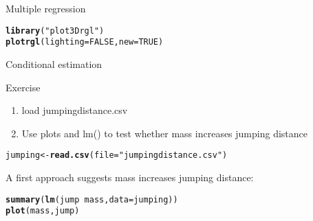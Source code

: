 \documentclass[10pt]{beamer}\usepackage[]{graphicx}\usepackage[]{color}
\makeatletter
\newcommand{\hlnum}[1]{\textcolor[rgb]{0.686,0.059,0.569}{#1}}%
\newcommand{\hlstr}[1]{\textcolor[rgb]{0.192,0.494,0.8}{#1}}%
\newcommand{\hlopt}[1]{\textcolor[rgb]{0,0,0}{#1}}%
\newcommand{\hlstd}[1]{\textcolor[rgb]{0.345,0.345,0.345}{#1}}%
\newcommand{\hlkwb}[1]{\textcolor[rgb]{0.69,0.353,0.396}{#1}}%
\newcommand{\hlkwc}[1]{\textcolor[rgb]{0.333,0.667,0.333}{#1}}%
\newcommand{\hlkwd}[1]{\textcolor[rgb]{0.737,0.353,0.396}{\textbf{#1}}}%
\newenvironment{kframe}{%
 \def\at@end@of@kframe{}%
 \ifinner\ifhmode%
  \def\at@end@of@kframe{\end{minipage}}%
  \begin{minipage}{\columnwidth}%
 \fi\fi%
 \def\FrameCommand##1{\hskip\@totalleftmargin \hskip-\fboxsep
 \colorbox{shadecolor}{##1}\hskip-\fboxsep
     \hskip-\linewidth \hskip-\@totalleftmargin \hskip\columnwidth}%
 \MakeFramed {\advance\hsize-\width
   \@totalleftmargin\z@ \linewidth\hsize
   \@setminipage}}%
 {\par\unskip\endMakeFramed%
 \at@end@of@kframe}
\newenvironment{knitrout}{}{} %
\makeatother
\begin{document}
\begin{frame}[fragile]{Multiple regression}

\begin{knitrout}\small
{}\color{fgcolor}\begin{kframe}
\begin{alltt}
    \hlkwd{library}\hlstd{(}\hlstr{"plot3Drgl"}\hlstd{)}
\hlkwd{plotrgl}\hlstd{(}\hlkwc{lighting} \hlstd{=} \hlnum{FALSE}\hlstd{,} \hlkwc{new}\hlstd{=}\hlnum{TRUE}\hlstd{)}
\end{alltt}
\end{kframe}
\end{knitrout}

\end{frame}

\begin{frame}[fragile]{Conditional estimation}

\begin{exampleblock}{Exercise}
  \begin{enumerate}
    \item load jumpingdistance.csv
    \item Use plots and lm() to test whether mass increases jumping distance
  \end{enumerate}
\end{exampleblock}



\begin{knitrout}\small
{}\color{fgcolor}\begin{kframe}
\begin{alltt}
  \hlstd{jumping} \hlkwb{<-} \hlkwd{read.csv}\hlstd{(}\hlkwc{file} \hlstd{=} \hlstr{"jumpingdistance.csv"}\hlstd{)}
\end{alltt}
\end{kframe}
\end{knitrout}

A first approach suggests mass increases jumping distance:
\begin{knitrout}\small
{}\color{fgcolor}\begin{kframe}
\begin{alltt}
    \hlkwd{summary}\hlstd{(}\hlkwd{lm}\hlstd{(jump} \hlopt{~} \hlstd{mass,} \hlkwc{data}\hlstd{=jumping))}
    \hlkwd{plot}\hlstd{(mass, jump)}
\end{alltt}
\end{kframe}
\end{knitrout}
  

\end{frame}
\end{document}

